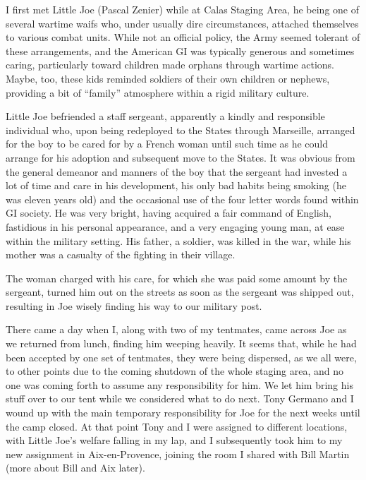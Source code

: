 \documentclass[../m3y]{subfiles}
\begin{document}
I first met Little Joe (Pascal Zenier) while at Calas Staging Area, he being one of several wartime waifs who, under usually dire circumstances, attached themselves to various combat units. While not an official policy, the Army seemed tolerant of these arrangements, and the American GI was typically generous and sometimes caring, particularly toward children made orphans through wartime actions. Maybe, too, these kids reminded soldiers of their own children or nephews, providing a bit of ``family'' atmosphere within a rigid military culture.

Little Joe befriended a staff sergeant, apparently a kindly and responsible individual who, upon being redeployed to the States through Marseille, arranged for the boy to be cared for by a French woman until such time as he could arrange for his adoption and subsequent move to the States. It was obvious from the general demeanor and manners of the boy that the sergeant had invested a lot of time and care in his development, his only bad habits being smoking (he was eleven years old) and the occasional use of the four letter words found within GI society. He was very bright, having acquired a fair command of English, fastidious in his personal appearance, and a very engaging young man, at ease within the military setting. His father, a soldier, was killed in the war, while his mother was a casualty of the fighting in their village.

The woman charged with his care, for which she was paid some amount by the sergeant, turned him out on the streets as soon as the sergeant was shipped out, resulting in Joe wisely finding his way to our military post.

There came a day when I, along with two of my tentmates, came across Joe as we returned from lunch, finding him weeping heavily. It seems that, while he had been accepted by one set of tentmates, they were being dispersed, as we all were, to other points due to the coming shutdown of the whole staging area, and no one was coming forth to assume any responsibility for him. We let him bring his stuff over to our tent while we considered  what to do next. Tony Germano and I wound up with the main temporary responsibility for Joe for the next weeks until the camp closed. At that point Tony and I were assigned to different locations, with Little Joe's welfare falling in my lap, and I subsequently took him to my new assignment in Aix-en-Provence, joining the room I shared with Bill Martin (more about Bill and Aix later).
\end{document}
